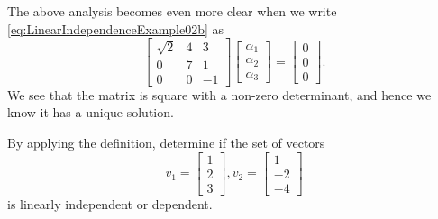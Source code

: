 The above analysis becomes even more clear when we write \eqref{eq:LinearIndependenceExample02b} as
\begin{equation}
\label{eq:LinearIndependenceExample02c}
   \left[ \begin{array}{ccr}  \sqrt{2} &  4 &  3 \\ 0 & 7  & 1 \\ 0 & 0 & -1  \end{array} \right]\left[ \begin{array}{r} \alpha_1 \\ \alpha_2 \\ \alpha_3   \end{array} \right] = \left[ \begin{array}{r} 0 \\ 0 \\ 0   \end{array} \right] .
\end{equation}
We see that the matrix is square with a non-zero determinant, and hence we know it has a unique solution. 
 \Qed \\
 
 \vspace{.5cm}

\begin{example} 
\label{ex:LinearIndep00} By applying the definition, determine  if the set of vectors $$ v_1 = \left[ \begin{array}{r} 1 \\2\\  3 \end{array} \right]  , v_2 = \left[ \begin{array}{r}  1 \\ -2  \\-4  \end{array} \right] $$
is linearly independent or dependent.
\end{example}


